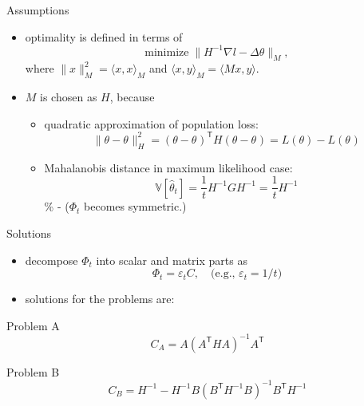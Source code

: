 \documentclass[fleqn,aspectratio=1610]{beamer}
\begin{document}
\begin{frame}[label={sec:org620cc81}]{Assumptions}
\begin{itemize}
\item optimality is defined in terms of
\begin{equation}
  \text{minimize}\;\|H^{-1}\nabla l-\varDelta\theta\|_{M},
\end{equation}
where 
\(\|x\|_{M}^{2}=\langle x,x\rangle_{M}\)
and 
\(\langle x,y\rangle_{M}=\langle Mx,y\rangle\).
\item \(M\) is chosen as \(H\), because
\begin{itemize}
\item quadratic approximation of population loss:
\begin{equation}
  \|\theta-\theta_{}\|_{H}^{2}
  =(\theta-\theta_{})^{\mathsf{T}}H(\theta-\theta_{})
  =L(\theta)-L(\theta_{})
\end{equation}
\item Mahalanobis distance in maximum likelihood case:
\begin{equation}
  \mathbb{V}[\hat\theta_{t}]
  =\frac{1}{t}H^{-1}GH^{-1}
  =\frac{1}{t}H^{-1}
\end{equation}
\% - (\(\varPhi_{t}\) becomes symmetric.)
\end{itemize}
\end{itemize}
\end{frame}

\begin{frame}[label={sec:org663a862}]{Solutions}
\begin{itemize}
\item decompose \(\varPhi_{t}\) into scalar and matrix parts as
\begin{equation}
  \varPhi_{t}=\varepsilon_{t} C,\quad\text{(e.g., \(\varepsilon_{t}=1/t\))}
\end{equation}
\item solutions for the problems are:
\end{itemize}
\begin{block}{Problem A}
\begin{equation}
  C_{A}=A(A^{\mathsf{T}}HA)^{-1}A^{\mathsf{T}}
\end{equation}
\end{block}
\begin{block}{Problem B}
\begin{equation}
  C_{B}=H^{-1}-H^{-1}B(B^{\mathsf{T}}H^{-1}B)^{-1}B^{\mathsf{T}}H^{-1}
\end{equation}
\end{block}
\end{frame}
\end{document}

